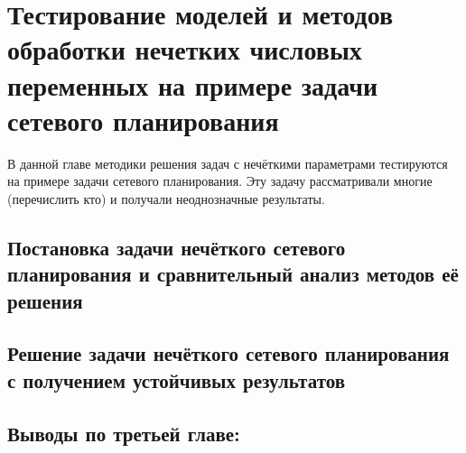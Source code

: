 \chapter{Тестирование моделей и методов обработки нечетких числовых переменных на примере задачи сетевого планирования}
\label{chapter3}

В данной главе методики решения задач с нечёткими параметрами тестируются на примере задачи сетевого планирования. Эту задачу рассматривали многие (перечислить кто) и получали неоднозначные результаты.


\section{Постановка задачи нечёткого сетевого планирования и сравнительный анализ методов её решения} 
\label{chapter3_1}


\section{Решение задачи нечёткого сетевого планирования с получением устойчивых результатов}
\label{chapter3_2}


\newpage
\section*{Выводы по третьей главе:} 
\label{chapter3_3}


